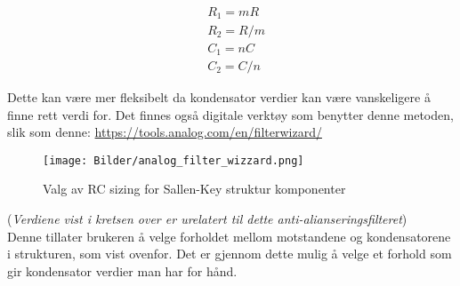 \begin{align*}
    &R_1 = mR \\
    &R_2 = R/m \\
    &C_1 = nC   \\
    &C_2 = C/n
\end{align*}

Dette kan være mer fleksibelt da kondensator verdier kan være vanskeligere å finne rett verdi for. Det finnes også digitale 
verktøy som benytter denne metoden, slik som denne: \url{https://tools.analog.com/en/filterwizard/}
\begin{figure}[H]
    \centering
    \texttt{[image: Bilder/analog\_filter\_wizzard.png]}
    \caption{Valg av RC sizing for Sallen-Key struktur komponenter}
    \label{analog-wizzard}
\end{figure}
(\textit{Verdiene vist i kretsen over er urelatert til dette anti-alianseringsfilteret})\\
Denne tillater brukeren å velge forholdet mellom motstandene og kondensatorene i strukturen, som vist ovenfor. Det er gjennom 
dette mulig å velge et forhold som gir kondensator verdier man har for hånd.

